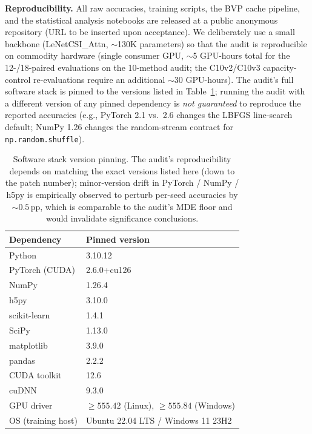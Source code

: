 \documentclass[11pt]{article}
\theoremstyle{definition}
\begin{document}
\textbf{Reproducibility.} All raw accuracies, training scripts, the BVP cache pipeline, and the statistical analysis notebooks are released at a public anonymous repository (URL to be inserted upon acceptance). We deliberately use a small backbone (LeNetCSI\_Attn, $\sim$130K parameters) so that the audit is reproducible on commodity hardware (single consumer GPU, $\sim$5 GPU-hours total for the 12-/18-paired evaluations on the 10-method audit; the C10v2/C10v3 capacity-control re-evaluations require an additional $\sim$30 GPU-hours). The audit's full software stack is pinned to the versions listed in Table~\ref{tab:software-pinning}; running the audit with a different version of any pinned dependency is \emph{not guaranteed} to reproduce the reported accuracies (e.g., PyTorch 2.1 vs.\ 2.6 changes the LBFGS line-search default; NumPy 1.26 changes the random-stream contract for \texttt{np.random.shuffle}).

\begin{table}[!h]
    \centering
    \caption{Software stack version pinning. The audit's reproducibility depends on matching the exact versions listed here (down to the patch number); minor-version drift in PyTorch / NumPy / h5py is empirically observed to perturb per-seed accuracies by $\sim$$0.5$\,pp, which is comparable to the audit's MDE floor and would invalidate significance conclusions.}
    \label{tab:software-pinning}
    \footnotesize
    \setlength{\tabcolsep}{4pt}
    \begin{tabular}{@{}l l@{}}
    \toprule
    Dependency & Pinned version \\
    \midrule
    Python                 & 3.10.12 \\
    PyTorch (CUDA)         & 2.6.0+cu126 \\
    NumPy                  & 1.26.4 \\
    h5py                   & 3.10.0 \\
    scikit-learn           & 1.4.1 \\
    SciPy                  & 1.13.0 \\
    matplotlib             & 3.9.0 \\
    pandas                 & 2.2.2 \\
    CUDA toolkit           & 12.6 \\
    cuDNN                  & 9.3.0 \\
    GPU driver             & $\ge$$555.42$ (Linux), $\ge$$555.84$ (Windows) \\
    OS (training host)     & Ubuntu 22.04 LTS / Windows 11 23H2 \\
    \bottomrule
    \end{tabular}
\end{table}
\end{document}
